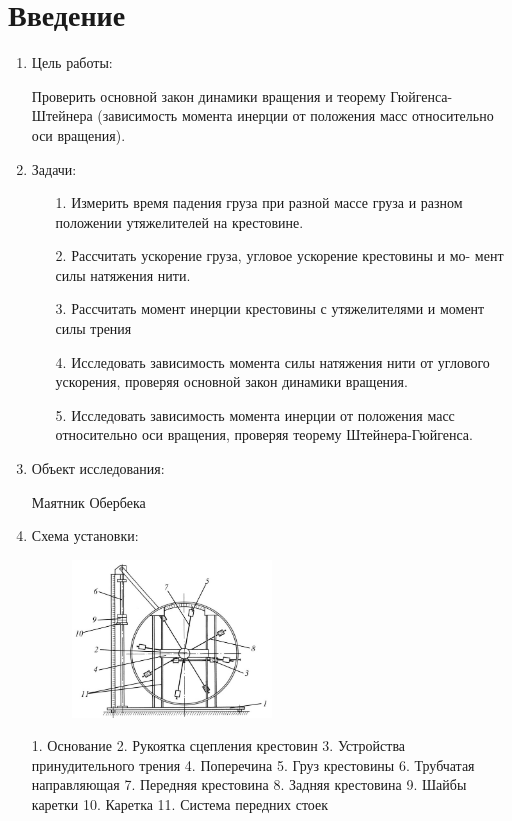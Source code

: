 \documentclass[12pt, a4paper]{article}
\begin{document}
\section{Введение}
\begin{enumerate}
\item Цель работы:

Проверить основной закон динамики вращения и теорему Гюйгенса-Штейнера (зависимость момента инерции от положения масс относительно оси вращения).

\item Задачи:
	\begin{enumerate}
		\item[1.]  Измерить время падения груза при разной массе груза и разном положении утяжелителей на крестовине.
		\item[2.] Рассчитать ускорение груза, угловое ускорение крестовины и мо-
мент силы натяжения нити.
		\item[3.] Рассчитать момент инерции крестовины с утяжелителями и момент силы трения
		\item[4.] Исследовать зависимость момента силы натяжения нити от углового ускорения, проверяя основной закон динамики вращения.
		\item[5.] Исследовать зависимость момента инерции от положения масс относительно оси вращения, проверяя теорему Штейнера-Гюйгенса.
	\end{enumerate}
		
\item Объект исследования:

Маятник Обербека

\item Схема установки:
\begin{figure}[h!]
\includegraphics[width=0.5\textwidth]{pendulum.jpg}
\centering
\end{figure}

1. Основание
2. Рукоятка сцепления крестовин
3. Устройства принудительного трения
4. Поперечина
5. Груз крестовины
6. Трубчатая направляющая
7. Передняя крестовина
8. Задняя крестовина
9. Шайбы каретки
10. Каретка
11. Система передних стоек


\end{enumerate}
\end{document}
